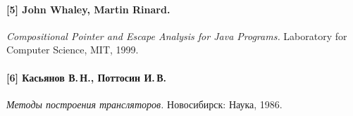\documentclass[a4,14pt,titlepage]{extarticle}
\newcommand{\eng}[1]{{\English#1}}
\begin{document}
    \paragraph{[5] John Whaley, Martin Rinard.}
      \eng{
        \textit{Compositional Pointer and Escape Analysis for Java Programs.}
        Laboratory for Computer Science, MIT,
        1999.
      }
    \paragraph{[6] Касьянов В.\,Н., Поттосин И.\,В.}
      \textit{Методы построения трансляторов.}
      Новосибирск: Наука,
      1986.
\end{document}
